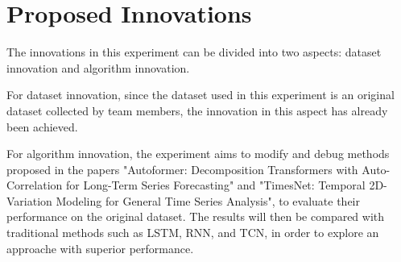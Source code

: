 \section{Proposed Innovations}
\label{sec:innovation}
The innovations in this experiment can be divided into two aspects: dataset innovation and algorithm innovation.

For dataset innovation, since the dataset used in this experiment is an original dataset collected by team members, the innovation in this aspect has already been achieved.

For algorithm innovation, the experiment aims to modify and debug methods proposed in the papers "Autoformer: Decomposition Transformers with Auto-Correlation for Long-Term Series Forecasting" and "TimesNet: Temporal 2D-Variation Modeling for General Time Series Analysis", to evaluate their performance on the original dataset. The results will then be compared with traditional methods such as LSTM, RNN, and TCN, in order to explore an approache with superior performance.
